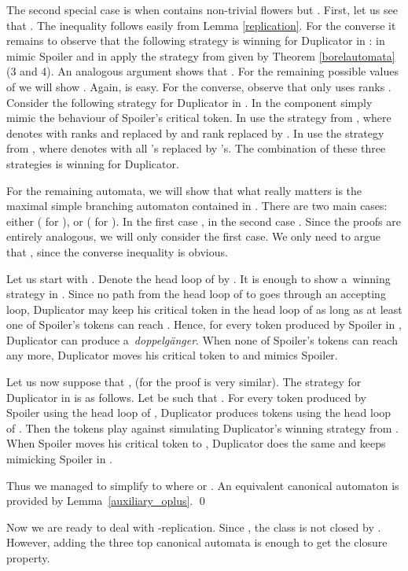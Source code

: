 \documentclass{LMCS}
\begin{document}
The second special case is when  contains non-trivial flowers but . First, let us see that  . The inequality  follows easily from Lemma \ref{replication}. For the converse it remains to observe that the following strategy is winning for Duplicator in : in  mimic Spoiler and  in  apply the strategy from  given by Theorem \ref{borelautomata} (3 and 4). An analogous argument shows that . For the remaining possible values of  we will show  .  Again,   is easy. For the converse, observe that  only uses ranks . Consider the following strategy for Duplicator in . In the component  simply mimic the behaviour of Spoiler's critical token. In  use the strategy from , where  denotes  with ranks  and  replaced by  and rank  replaced by . In  use the strategy from , where  denotes  with all 's replaced by 's. The combination of these three strategies is winning for Duplicator.

For the remaining automata, we will show that what really matters is the maximal simple branching automaton contained in . There are two main cases: either  ( for ),  or  ( for ).  In the first case , in the second case . Since the proofs are entirely analogous, we will only consider the first case. We only need to argue that , since the converse inequality is obvious.

Let us start with . Denote the head loop of  by . It is enough to show a~winning strategy in . Since no path from the head loop of  to  goes through an accepting loop, Duplicator may keep his critical token in the head loop of  as long as at least one of Spoiler's tokens can reach . Hence, for every token produced by Spoiler in , Duplicator can produce a~{\em doppelg\"anger}. When none of Spoiler's tokens can reach  any more, Duplicator moves his critical token to  and mimics Spoiler.

Let us now suppose that ,  (for  the proof is very similar). The strategy for Duplicator in  is as follows. Let  be such that . For every token  produced by Spoiler using the head loop of , Duplicator produces  tokens  using the head loop of . Then the tokens  play against  simulating Duplicator's winning strategy from . When Spoiler moves his critical token to , Duplicator does the same and keeps mimicking Spoiler in .

Thus we managed to simplify  to  where  or . An equivalent canonical automaton is provided by Lemma~\ref{auxiliary_oplus}.  \qed

\vspace{5pt}

Now we are ready to deal with -replication. Since , the class  is not closed by . However, adding the three top canonical automata is enough to get the closure property.
\end{document}
